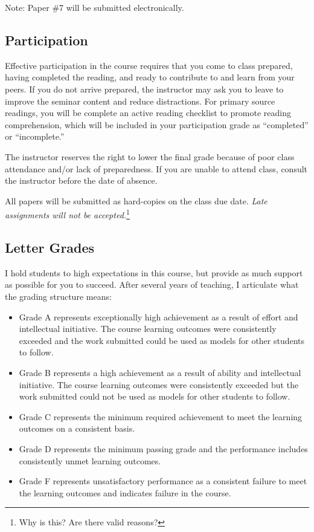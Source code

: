 Note: Paper \#7 will be submitted electronically.

\subsection{Participation}

Effective participation in the course requires that you come to class prepared, having completed the reading, and ready to contribute to and learn from your peers. If you do not arrive prepared, the instructor may ask you to leave to improve the seminar content and reduce distractions. For primary source readings, you will be complete an active reading checklist to promote reading comprehension, which will be included in your participation grade as ``completed'' or ``incomplete.''

The instructor reserves the right to lower the final grade because of poor class attendance and/or lack of preparedness. If you are unable to attend class, consult the instructor before the date of absence.

All papers will be submitted as hard-copies on the class due date. \emph{Late assignments will not be accepted.}\footnote{Why is this? Are there valid reasons?} 

\subsection{Letter Grades}

I hold students to high expectations in this course, but provide as much support as possible for you to succeed. After several years of teaching, I articulate what the grading structure means:
  
\begin{itemize}
	\item Grade A represents exceptionally high achievement as a result of effort and intellectual initiative. The course learning outcomes were consistently exceeded and the work submitted could be used as models for other students to follow.
	\item Grade B represents a high achievement as a result of ability and intellectual initiative. The course learning outcomes were consistently exceeded but the work submitted could not be used as models for other students to follow.
	\item Grade C represents the minimum required achievement to meet the learning outcomes on a consistent basis. 
	\item Grade D represents the minimum passing grade and the performance includes consistently unmet learning outcomes. 
	\item Grade F represents unsatisfactory performance as a consistent failure to meet the learning outcomes and indicates failure in the course.
\end{itemize}

